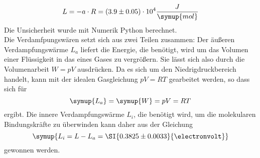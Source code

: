   \begin{equation*}
    L= - a \cdot R = (3.9 \pm 0.05) \cdot 10^4 \dfrac{J}{\symup{mol}}
  \end{equation*}
  Die Unsicherheit wurde mit Numerik Python berechnet.\\
  Die Verdamfpungswären setzt sich aus zwei Teilen zusammen: Der äußeren Verdampfungswärme $L_a$
  liefert die Energie, die benötigt, wird um das Volumen einer Flüssigkeit in das eines 
  Gases zu vergrößern. Sie lässt sich also durch die Volumenarbeit $W = pV$ ausdrücken. Da es sich um 
  den Niedrigdruckbereich handelt, kann mit der idealen Gasgleichung $pV = RT$ gearbeitet 
  werden, so dass sich für 
  \begin{equation*}
  \symup{L_a} = \symup{W} = pV = RT
  \end{equation*}
  ergibt. Die innere Verdampfungswärme $L_i$, die benötigt wird, um die molekularen Bindungskräfte
  zu überwinden kann daher aus der Gleichung
  \begin{equation*}
  \symup{L_i = L - L_a = \SI{0.3825 \pm 0.0033}{\electronvolt}}
  \end{equation*}
  gewonnen werden.


